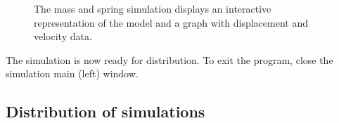 \begin{figure}[htb]
  \centering
  \caption{The mass and spring simulation displays an interactive representation of the model and a graph with displacement and velocity data.}
  \label{fig:02EjsIntro/SpringRunning}
\end{figure}

The simulation is now ready for distribution.
To exit the program, close the simulation main (left) window.

\subsection{Distribution of simulations}\label{section:02Distribution}

